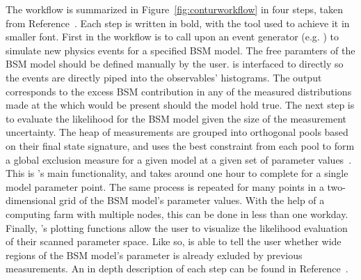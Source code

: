 The \contur workflow is summarized in Figure~\ref{fig:conturworkflow} in four steps, taken from Reference~\cite{conturmanual}. Each step is written in bold, with the tool used to achieve it in smaller font. First in the workflow is to call upon an event generator (e.g. \herwig) to simulate new physics events for a specified BSM model. The free paramters of the BSM model should be defined manually by the user. \herwig is interfaced to \rivet directly so the events are directly piped into the observables' histograms. The \rivet output corresponds to the excess BSM contribution in any of the measured distributions made at the \LHC which would be present should the model hold true. The next step is to evaluate the likelihood for the BSM model given the size of the measurement uncertainty. The heap of measurements are grouped into orthogonal pools based on their final state signature, and \contur uses the best constraint from each pool to form a global exclusion measure for a given model at a given set of parameter values~\cite{conturmanual}. This is \contur's main functionality, and takes around one hour to complete for a single model parameter point. The same process is repeated for many points in a two-dimensional grid of the BSM model's parameter values. With the help of a computing farm with multiple nodes, this can be done in less than one workday. Finally, \contur's plotting functions allow the user to visualize the likelihood evaluation of their scanned parameter space. Like so, \contur is able to tell the user whether wide regions of the BSM model's parameter is already exluded by \LHC previous measurements. An in depth description of each step can be found in Reference~\cite{conturmanual}. 
